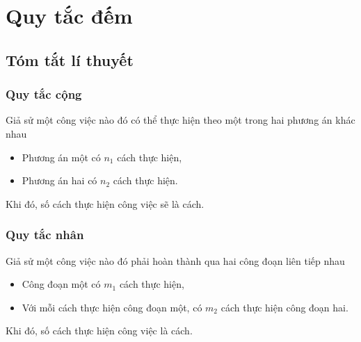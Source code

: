 \def\tenchude{QUY TẮC ĐẾM}
\setcounter{section}{0}
\setcounter{dang}{0}
\section{Quy tắc đếm}
\subsection{Tóm tắt lí thuyết}
\subsubsection{Quy tắc cộng}
Giả sử một công việc nào đó có thể thực hiện theo một trong hai phương án khác nhau
\begin{itemize}
	\item Phương án một có $n_1$ cách thực hiện,
	\item Phương án hai có $n_2$ cách thực hiện.
\end{itemize}
Khi đó, số cách thực hiện công việc sẽ là  cách.
\subsubsection{Quy tắc nhân}
Giả sử một công việc nào đó phải hoàn thành qua hai công đoạn liên tiếp nhau
\begin{itemize}
	\item Công đoạn một có $m_1$ cách thực hiện,
	\item Với mỗi cách thực hiện công đoạn một, có $m_2$ cách thực hiện công đoạn hai.
\end{itemize}
Khi đó, số cách thực hiện công việc là  cách.

